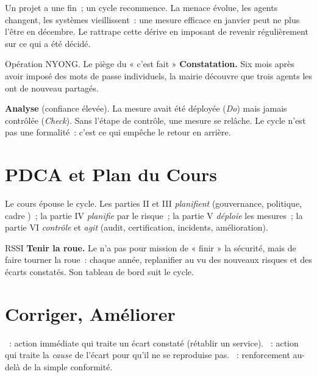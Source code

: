 Un projet a une fin~; un cycle recommence. La menace évolue, les agents
changent, les systèmes vieillissent~: une mesure efficace en janvier peut ne
plus l'être en décembre. Le  rattrape cette dérive en imposant de
revenir régulièrement sur ce qui a été décidé.

\begin{boxscenario}{Opération NYONG. Le piège du « c'est fait »}
\textbf{Constatation.} Six mois après avoir imposé des mots de passe
individuels, la mairie découvre que trois agents les ont de nouveau partagés.

\medskip
\textbf{Analyse} (confiance élevée). La mesure avait été déployée (\emph{Do})
mais jamais contrôlée (\emph{Check}). Sans l'étape de contrôle, une mesure se
relâche. Le cycle n'est pas une formalité~: c'est ce qui empêche le retour en
arrière.
\end{boxscenario}

\section{PDCA et Plan du Cours}
\label{sec:c03-plan}

Le cours épouse le cycle. Les parties II et III \emph{planifient} (gouvernance,
politique, cadre )~; la partie IV \emph{planifie} par le
risque~; la partie V \emph{déploie} les mesures~; la partie VI \emph{contrôle}
et \emph{agit} (audit, certification, incidents, amélioration).

\begin{boxmetier}{RSSI}
\textbf{Tenir la roue.} Le  n'a pas pour mission de « finir » la
sécurité, mais de faire tourner la roue~: chaque année, replanifier au vu des
nouveaux risques et des écarts constatés. Son tableau de bord suit le cycle.
\end{boxmetier}

\section{Corriger, Améliorer}
\label{sec:c03-corriger}

\begin{boxdef}
~: action immédiate qui traite un écart constaté (rétablir
un service). ~: action qui traite la \emph{cause}
de l'écart pour qu'il ne se reproduise pas. ~:
renforcement au-delà de la simple conformité.
\end{boxdef}


